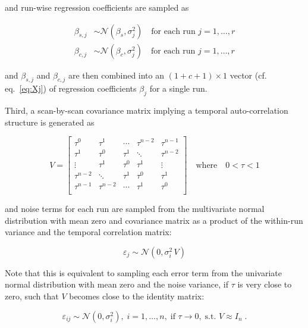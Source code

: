\documentclass[a4paper,12pt]{article}
\begin{document}
and run-wise regression coefficients are sampled as

\vspace{-0.5em}
\begin{equation} \label{eq:bj}
\begin{split}
\beta_{s,j} &\sim \mathcal{N}(\beta_s, \sigma_j^2) \quad \text{for each run } j = 1,\ldots,r \\
\beta_{c,j} &\sim \mathcal{N}(\beta_c, \sigma_j^2) \quad \text{for each run } j = 1,\ldots,r
\end{split}
\end{equation}

and $\beta_{s,j}$ and $\beta_{c,j}$ are then combined into an $(1+c+1) \times 1$ vector (cf. eq.~\ref{eq:Xj}) of regression coefficients $\beta_j$ for a single run.

\pagebreak
Third, a scan-by-scan covariance matrix implying a temporal auto-correlation structure is generated as

\begin{equation} \label{eq:V}
V = \left[ \begin{matrix}
\tau^0 & \tau^1 & \cdots & \tau^{n-2} & \tau^{n-1} \\
\tau^1 & \tau^0 & \tau^1 & \ddots & \tau^{n-2} \\
\vdots & \tau^1 & \tau^0 & \tau^1 & \vdots \\
\tau^{n-2} & \ddots & \tau^1 & \tau^0 & \tau^1 \\
\tau^{n-1} & \tau^{n-2} & \cdots & \tau^1 & \tau^0 \\
\end{matrix} \right] \quad \text{where} \quad 0 < \tau < 1
\end{equation}

and noise terms for each run are sampled from the multivariate normal distribution with mean zero and covariance matrix as a product of the within-run variance and the temporal correlation matrix:

\begin{equation} \label{eq:ej}
\varepsilon_j \sim \mathcal{N}(0, \sigma_i^2 \, V)
\end{equation}

Note that this is equivalent to sampling each error term from the univariate normal distribution with mean zero and the noise variance, if $\tau$ is very close to zero, such that $V$ becomes close to the identity matrix:

\begin{equation} \label{eq:eij}
\varepsilon_{ij} \sim \mathcal{N}(0, \sigma_i^2), \; i = 1,\ldots,n, \; \text{if } \tau \rightarrow 0, \; \text{s.t. } V \approx I_n \; .
\end{equation}
\end{document}

